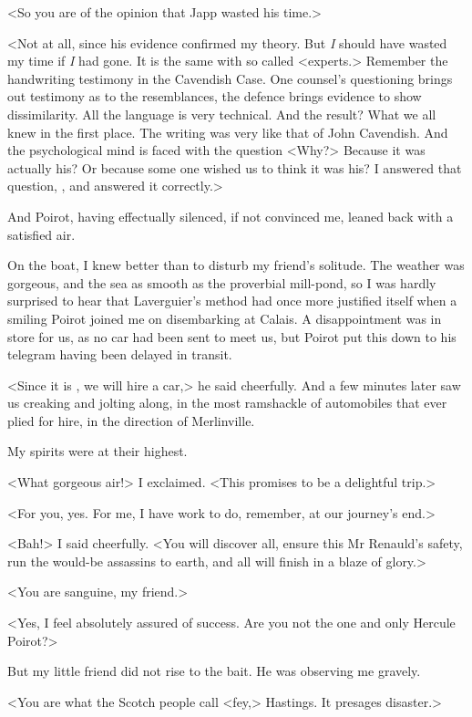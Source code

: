  <So you are of the opinion that Japp wasted his time.> 

 <Not at all, since his evidence confirmed my theory. But \emph{I} should have wasted my time if \emph{I} had gone. It is the same with so called <experts.> Remember the handwriting testimony in the Cavendish Case. One counsel's questioning brings out testimony as to the resemblances, the defence brings evidence to show dissimilarity. All the language is very technical. And the result? What we all knew in the first place. The writing was very like that of John Cavendish. And the psychological mind is faced with the question <Why?> Because it was actually his? Or because some one wished us to think it was his? I answered that question, , and answered it correctly.> 

 And Poirot, having effectually silenced, if not convinced me, leaned back with a satisfied air. 

 On the boat, I knew better than to disturb my friend's solitude. The weather was gorgeous, and the sea as smooth as the proverbial mill-pond, so I was hardly surprised to hear that Laverguier's method had once more justified itself when a smiling Poirot joined me on disembarking at Calais. A disappointment was in store for us, as no car had been sent to meet us, but Poirot put this down to his telegram having been delayed in transit. 

 <Since it is , we will hire a car,> he said cheerfully. And a few minutes later saw us creaking and jolting along, in the most ramshackle of automobiles that ever plied for hire, in the direction of Merlinville. 

 My spirits were at their highest. 

 <What gorgeous air!> I exclaimed. <This promises to be a delightful trip.> 

 <For you, yes. For me, I have work to do, remember, at our journey's end.> 

 <Bah!> I said cheerfully. <You will discover all, ensure this Mr Renauld's safety, run the would-be assassins to earth, and all will finish in a blaze of glory.> 

 <You are sanguine, my friend.> 

 <Yes, I feel absolutely assured of success. Are you not the one and only Hercule Poirot?> 

 But my little friend did not rise to the bait. He was observing me gravely. 

 <You are what the Scotch people call <fey,> Hastings. It presages disaster.> 

